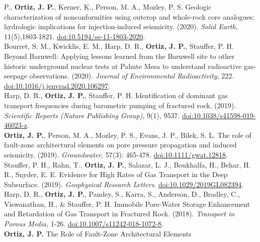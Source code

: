 \documentclass[11pt, letterpaper]{article}
\newcommand{\years}[1]{\marginnote{\scriptsize #1}}
\begin{document}
P., \textbf{Ortiz, J. P.}, Kerner, K., Person, M. A., Mozley, P. S.
Geologic characterization of nonconformities using outcrop and whole-rock core
analogues: hydrologic implications for injection-induced seismicity. (2020).
\emph{Solid Earth}, 11(5),1803-1821. 
\href{https://se.copernicus.org/articles/11/1803/2020/se-11-1803-2020.pdf}{doi:10.5194/se-11-1803-2020}.\\
%
\years{2020}Bourret, S. M., Kwicklis, E. M., Harp, D. R., \textbf{Ortiz, J.
P.}, Stauffer, P. H. Beyond Barnwell: Applying lessons learned from the
Barnwell site to other historic underground nuclear tests at Pahute Mesa to
understand radioactive gas-seepage observations. (2020). \emph{Journal of Environmental
Radioactivity}, 222. 
\href{https://www.sciencedirect.com/science/article/pii/S0265931X20300199/pdfft?md5=63166f84895846446b3a9ce93cc68c79&pid=1-s2.0-S0265931X20300199-main.pdf}{doi:10.1016/j.jenvrad.2020.106297}.\\
%
\years{2019}Harp, D. R., \textbf{Ortiz, J. P.}, Stauffer, P. H. Identification
of dominant gas transport frequencies during barometric pumping of fractured
rock. (2019). \emph{Scientific Reports (Nature Publishing Group)}, 9(1), 9537.
\href{https://www.nature.com/articles/s41598-019-46023-z.pdf}{doi:10.1038/s41598-019-46023-z}. \\ 
%
\years{2019}\textbf{Ortiz, J. P.}, Person,
M. A., Mozley, P. S., Evans, J. P., Bilek, S. L. The role of fault-zone
architectural elements on pore pressure propagation and induced seismicity.
(2019). \emph{Groundwater}, 57(3): 465-478. 
\href{https://ngwa.onlinelibrary.wiley.com/doi/epdf/10.1111/gwat.12818}{doi:10.1111/gwat.12818}.\\
%
\years{2019}Stauffer, P. H., Rahn, T., \textbf{Ortiz, J. P.}, Salazar, L. J.,
Boukhalfa, H., Behar, H. R., Snyder, E. E. Evidence for High Rates of Gas
Transport in the Deep Subsurface. (2019). \emph{Geophysical Research Letters}.
\href{https://agupubs.onlinelibrary.wiley.com/doi/epdf/10.1029/2019GL082394}{doi:10.1029/2019GL082394}.\\ 
%
\years{2018}Harp, D. R., \textbf{Ortiz, J. P.},
Pandey, S., Karra, S., Anderson, D., Bradley, C., Viswanathan, H., \& Stauffer,
P. H. Immobile Pore-Water Storage Enhancement and Retardation of Gas Transport
in Fractured Rock. (2018). \emph{Transport in Porous Media}, 1-26.
\href{https://link.springer.com/content/pdf/10.1007/s11242-018-1072-8.pdf}{doi:10.1007/s11242-018-1072-8}.\\ 
\years{2017}\textbf{Ortiz, J. P.} The Role of Fault-Zone Architectural Elements
\end{document}
